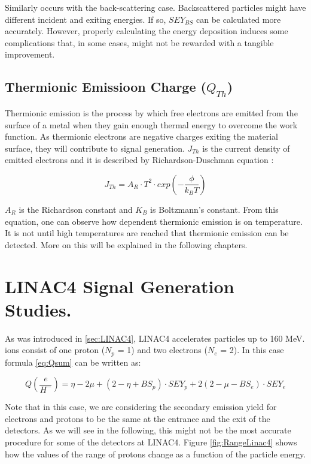 Similarly occurs with the back-scattering case. Backscattered particles might have different incident and exiting energies. If so,  $SEY_{BS}$ can be calculated more accurately. However, properly calculating the energy deposition induces some complications that, in some cases, might not be rewarded with a tangible improvement. 

\subsection{Thermionic Emissioon Charge ($Q_{Th}$)}

Thermionic emission is the process by which free electrons are emitted from the surface of a metal when they gain enough thermal energy to overcome the work function. As thermionic electrons are negative charges exiting the material surface, they will contribute to signal generation. $J_{Th}$ is the current density of emitted electrons and it is described by Richardson-Duschman equation \parencite[][]{ref:Richardson}:

\begin{equation}
    J_{Th} = A_R \cdot T^2 \cdot exp\left(-\frac{\phi}{k_B T} \right) 
\end{equation}

$A_R$ is the Richardson constant and $K_B$ is Boltzmann's constant. From this equation, one can observe how dependent thermionic emission is on temperature. It is not until high temperatures are reached that thermionic emission can be detected. More on this will be explained in the following chapters. 

\section{LINAC4 Signal Generation Studies.}

As was introduced in \ref{sec:LINAC4}, LINAC4 accelerates \hm particles up to 160 MeV. \hm ions consist of one proton ($N_p$ = 1) and two electrons ($N_e$ = 2). In this case formula \ref{eq:Qsum} can be written as: 

\begin{equation}
    Q\left(\frac{e}{H^{-}}\right) = \eta - 2\mu + \left( 2 - \eta + BS_p \right) \cdot SEY_p +2\left( 2 - \mu - BS_e \right) \cdot SEY_e
    \label{eq:Ql4}
\end{equation}

Note that in this case, we are considering the secondary emission yield for electrons and protons to be the same at the entrance and the exit of the detectors. As we will see in the following, this might not be the most accurate procedure for some of the detectors at LINAC4. Figure \ref{fig:RangeLinac4} shows how the values of the range of protons change as a function of the particle energy. 

